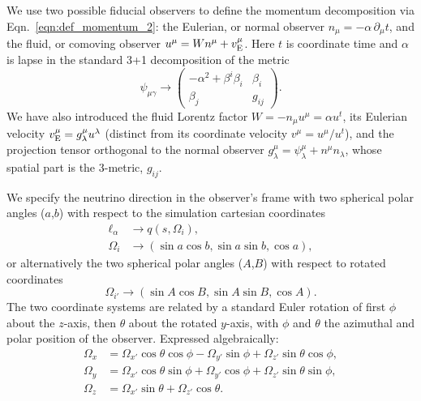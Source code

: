 \documentclass[aps,floatfix,prd,superscriptaddress,twocolumn]{revtex4-1}
\begin{document}
We use two possible fiducial observers to define the momentum
decomposition via Eqn.~\ref{eqn:def_momentum_2}: the Eulerian,
or normal observer $n_\mu=-\alpha \,\partial_\mu t$,
and the fluid, or comoving observer
$u^\mu=Wn^\mu+v_{\rm E}^\mu$.
Here $t$ is coordinate time and $\alpha$ is lapse
in the standard 3+1 decomposition of the metric
\begin{equation}
  \label{eqn:adm_metric}
  \psi_{\mu\gamma} \rightarrow
  \left(
  \begin{matrix}
    -\alpha^2 + \beta^i \beta_i  & \beta_i \\
    \beta_j                      & g_{ij}
  \end{matrix}
  \right).
\end{equation}
We have also introduced
the fluid Lorentz factor $W=-n_\mu u^\mu=\alpha u^t$,
its Eulerian velocity $v_{\rm E}^\mu=g^\mu_\lambda u^\lambda$
(distinct from its coordinate velocity $v^\mu=u^\mu/u^t$),
and the projection tensor orthogonal to the normal observer
$g^\mu_\lambda=\psi^\mu_\lambda+n^\mu n_\lambda$,
whose spatial part is the 3-metric, $g_{ij}$.

We specify the neutrino direction in the observer's frame
with two spherical polar angles
($a$,$b$) with respect to the simulation cartesian coordinates
\begin{align}
  \ell_\alpha &\rightarrow q(s,\Omega_i), \\
  \Omega_i &\rightarrow (\sin a \cos b,\sin a\sin b,\cos a),
\end{align}
or alternatively the two spherical polar angles
($A$,$B$) with respect to rotated coordinates
\begin{equation}
  \label{eqn:def_direction_primed_2}
  \Omega_{i'} \rightarrow  (\sin A \cos B,\sin A\sin B,\cos A).
\end{equation}
The two coordinate systems are related by a standard Euler rotation of first
$\phi$ about the $z$-axis, then $\theta$ about the rotated $y$-axis,
with $\phi$ and $\theta$ the azimuthal and polar position of the observer.
Expressed algebraically:
\begin{align}
  \label{eqn:rotation_connection}
  \Omega_x &= \Omega_{x'}\cos\theta\cos\phi-\Omega_{y'}\sin\phi+\Omega_{z'}\sin\theta\cos\phi,\nonumber\\
  \Omega_y &= \Omega_{x'}\cos\theta\sin\phi+\Omega_{y'}\cos\phi+\Omega_{z'}\sin\theta\sin\phi,\nonumber\\
  \Omega_z &= \Omega_{x'}\sin\theta+\Omega_{z'}\cos\theta.
\end{align}
\end{document}
